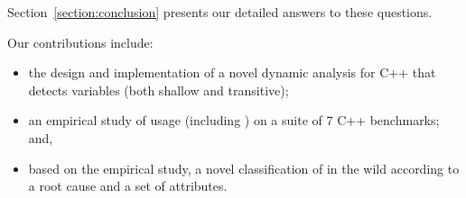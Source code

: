 Section~\ref{section:conclusion} presents our detailed answers to these questions.

\vspace*{1em}
Our contributions include:
\vspace*{-0.25em}
\begin{itemize}
  \item the design and implementation of a novel dynamic analysis for C++ that
        detects \wstcqd{} variables (both shallow and transitive);
  \item an empirical study of \const{} usage (including \wstcqs{}) on a suite of
        7 C++ benchmarks; and,
  \item based on the empirical study, a novel classification of \wstcqs{} in the
        wild according to a root cause and a set of attributes.
\end{itemize}
